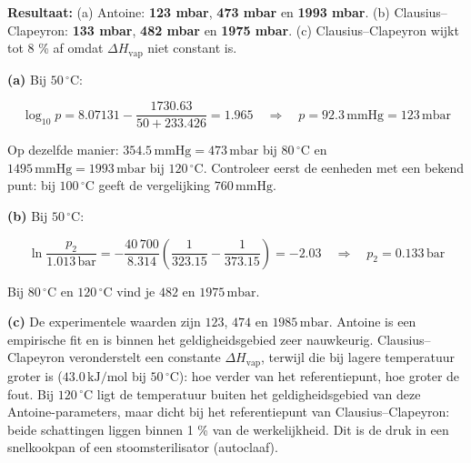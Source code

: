 \begin{oplossing}
\textbf{Resultaat:} (a) Antoine: \textbf{123 mbar}, \textbf{473 mbar} en \textbf{1993 mbar}. (b) Clausius--Clapeyron: \textbf{133 mbar}, \textbf{482 mbar} en \textbf{1975 mbar}. (c) Clausius--Clapeyron wijkt tot 8 \% af omdat \(\Delta H_{\text{vap}}\) niet constant is.

\textbf{(a)} Bij \(50\,^\circ\mathrm{C}\):

\[
\log_{10} p = 8.07131 - \frac{1730.63}{50 + 233.426} = 1.965 \quad\Rightarrow\quad p = 92.3\,\mathrm{mmHg} = 123\,\mathrm{mbar}
\]

Op dezelfde manier: \(354.5\,\mathrm{mmHg} = 473\,\mathrm{mbar}\) bij \(80\,^\circ\mathrm{C}\) en \(1495\,\mathrm{mmHg} = 1993\,\mathrm{mbar}\) bij \(120\,^\circ\mathrm{C}\). Controleer eerst de eenheden met een bekend punt: bij \(100\,^\circ\mathrm{C}\) geeft de vergelijking \(760\,\mathrm{mmHg}\).

\textbf{(b)} Bij \(50\,^\circ\mathrm{C}\):

\[
\ln\frac{p_2}{1.013\,\mathrm{bar}} = -\frac{40\,700}{8.314}\left(\frac{1}{323.15} - \frac{1}{373.15}\right) = -2.03 \quad\Rightarrow\quad p_2 = 0.133\,\mathrm{bar}
\]

Bij \(80\,^\circ\mathrm{C}\) en \(120\,^\circ\mathrm{C}\) vind je \(482\) en \(1975\,\mathrm{mbar}\).

\textbf{(c)} De experimentele waarden zijn \(123\), \(474\) en \(1985\,\mathrm{mbar}\). Antoine is een empirische fit en is binnen het geldigheidsgebied zeer nauwkeurig. Clausius--Clapeyron veronderstelt een constante \(\Delta H_{\text{vap}}\), terwijl die bij lagere temperatuur groter is (\(43.0\,\mathrm{kJ/mol}\) bij \(50\,^\circ\mathrm{C}\)): hoe verder van het referentiepunt, hoe groter de fout. Bij \(120\,^\circ\mathrm{C}\) ligt de temperatuur buiten het geldigheidsgebied van deze Antoine-parameters, maar dicht bij het referentiepunt van Clausius--Clapeyron: beide schattingen liggen binnen 1 \% van de werkelijkheid. Dit is de druk in een snelkookpan of een stoomsterilisator (autoclaaf).
\end{oplossing}

